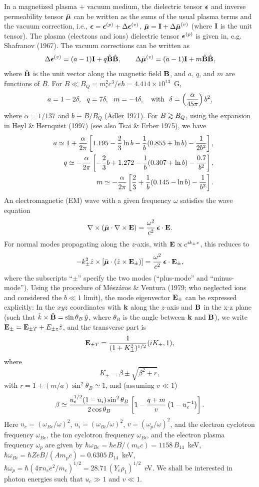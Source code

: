 \documentclass{aastex}
\def\be{\begin{equation}}
\def\ee{\end{equation}}
\def\ba{\begin{eqnarray}}
\def\ea{\end{eqnarray}}
\def\go{\mathrel{\raise.3ex\hbox{$>$}\mkern-14mu
             \lower0.6ex\hbox{$\sim$}}}
\def\beps{{\mbox{\boldmath $\epsilon$}}}
\def\bmu{{\mbox{\boldmath $\mu$}}}
\def\bE{{\bf E}}
\def\bB{{\bf B}}
\def\bI{{\bf I}}
\begin{document}
In a magnetized plasma + vacuum medium, the dielectric tensor $\beps$
and inverse permeability tensor $\bar\bmu$ can be written as the sums
of the usual plasma terms and the vacuum correction, i.e.,
$\beps=\beps^{(p)}+\Delta\beps^{(v)}$,
$\bar\bmu=\bI+\Delta\bar\bmu^{(v)}$ (where $\bI$ is the unit tensor).
The plasma (electrons and ions) dielectric tensor $\beps^{(p)}$ is given in,
e.g. Shafranov (1967).
The vacuum corrections can be written as
\be
\Delta\beps^{(v)}=(a-1)\bI +q\hat\bB\hat\bB,\qquad
\Delta\bar\bmu^{(v)}=(a-1)\bI+m\hat\bB\hat\bB,
\ee
where $\hat\bB$ is the unit vector along the magnetic field
$\bB$, and $a$, $q$, and $m$ are functions of $B$.
For $B\ll B_Q=m_e^2c^3/e\hbar=4.414\times 10^{13}$~G,
\be
a=1-2\delta,~~q=7\delta,~~m=-4\delta,\quad {\rm with}~~
\delta=\left({\alpha\over 45\pi}\right)b^2,
\ee
where $\alpha=1/137$ and $b\equiv B/B_Q$ (Adler 1971).
For $B\go B_Q$, using the expansion in Heyl \& Hernquist (1997) (see also
Tsai \& Erber 1975), we have
\ba
&&a\simeq 1+{\alpha\over 2\pi}\left[1.195-{2\over 3}\ln b-{1\over b}
(0.855+\ln b)-{1\over 2b^2}\right],\\
&&q\simeq -{\alpha\over 2\pi}\left[-{2\over 3}b+1.272-{1\over b}
(0.307+\ln b)-{0.7\over b^2}\right],\\
&&m\simeq -{\alpha\over 2\pi}\left[{2\over 3}+{1\over b}(0.145-\ln b)-{1\over
b^2}\right].
\ea
An electromagnetic (EM) wave with a given frequency $\omega$ satisfies the
wave equation
\be
\nabla\times(\bar\bmu\cdot\nabla\times\bE)={\omega^2\over c^2}\,\beps\cdot
\bE.
\label{waveeq}\ee
For normal modes propagating along the $z$-axis, with
$\bE\propto e^{ik_\pm z}$, this reduces to
\be
-k_\pm^2\hat z\times\left[\bar\bmu\cdot (\hat z\times \bE_{\pm})
\right]={\omega^2\over c^2}\,\beps\cdot\bE_\pm,
\label{eqmode}\ee
where the subscripts ``$\pm$'' specify the two modes 
(``plus-mode'' and ``minus-mode'').
Using the procedure of M\'{e}sz\'{a}ros \& Ventura (1979; who neglected ions
and considered the $b\ll 1$ limit), the mode eigenvector
$\bE_\pm$ can be expressed explicitly: In the $xyz$ coordinates
with ${\bf k}$ along the $z$-axis and $\bB$ in the x-z plane
(such that ${\hat k}\times\hat\bB=\sin\theta_B\,\hat y$, where
$\theta_B$ is the angle between ${\bf k}$ and $\bB$), we write
$\bE_\pm=\bE_{\pm T}+E_{\pm z}\hat z$, and the transverse part is 
\be
\bE_{\pm T}={1\over (1+K_\pm^2)^{1/2}}(iK_\pm,1),
\ee
where
\be
K_{\pm}=\beta\pm\sqrt{\beta^2+r},
\ee
with $r=1+(m/a)\sin^2\theta_B\simeq 1$, and (assuming $v\ll 1$)
\be
\beta\simeq  {u_e^{1/2}(1-u_i)\sin^2\theta_B\over 2\cos\theta_B}
\left[1-{q+m\over v}\left(1-u_e^{-1}\right)\right].
\label{eqbeta}\ee
Here $u_e=(\omega_{Be}/\omega)^2$, $u_i=(\omega_{Bi}/\omega)^2$,
$v=(\omega_p/\omega)^2$, and the electron cyclotron frequency
$\omega_{Be}$, the ion cyclotron frequency $\omega_{Bi}$, and the electron
plasma frequency $\omega_p$ are given by
$\hbar\omega_{Be} = \hbar eB/(m_ec)=1158\,B_{14}$~keV,
$\hbar\omega_{Bi} =\hbar ZeB/(Am_pc)= 0.6305\,B_{14}$~keV,
$\hbar\omega_p= \hbar (4\pi n_e e^2/m_e)^{1/2}=28.71\,
(Y_e\rho_1)^{1/2}$~eV. We shall be interested in photon energies
such that $u_e\gg 1$ and $v\ll 1$.
\end{document}
